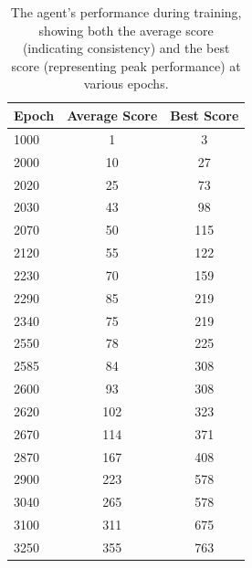 \documentclass[a4paper,12pt]{article}
\begin{document}
\begin{table}[h!]
    \centering
    \begin{tabular}{|l|c|c|}
    \hline
    \textbf{Epoch} & \textbf{Average Score} & \textbf{Best Score} \\ \hline
    1000        & 1                         & 3                   \\ \hline
    2000        & 10                        & 27                  \\ \hline
    2020        & 25                        & 73                  \\ \hline
    2030        & 43                        & 98                  \\ \hline
    2070        & 50                        & 115                 \\ \hline
    2120        & 55                        & 122                 \\ \hline
    2230        & 70                        & 159                 \\ \hline
    2290        & 85                        & 219                 \\ \hline
    2340        & 75                        & 219                 \\ \hline
    2550        & 78                        & 225                 \\ \hline
    2585        & 84                        & 308                 \\ \hline
    2600        & 93                        & 308                 \\ \hline
    2620        & 102                       & 323                 \\ \hline
    2670        & 114                       & 371                 \\ \hline
    2870        & 167                       & 408                 \\ \hline
    2900        & 223                       & 578                 \\ \hline
    3040        & 265                       & 578                 \\ \hline
    3100        & 311                       & 675                 \\ \hline
    3250        & 355                       & 763                 \\ \hline
    \end{tabular}
    \caption{The agent's performance during training, showing both the average score (indicating consistency) and the best score (representing peak performance) at various epochs.}
    \label{tab:performance}
    \end{table}
\end{document}
